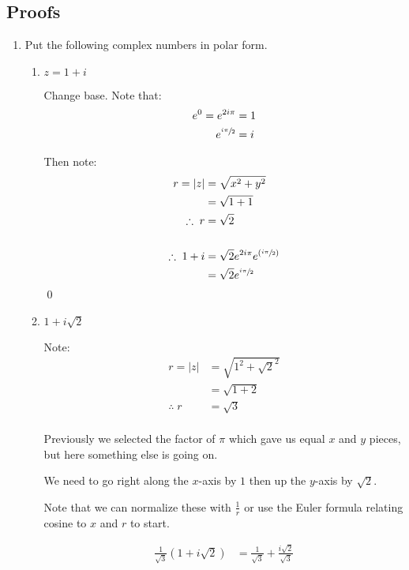 \subsection{Proofs}
\begin{enumerate}


	\item Put the following complex numbers in polar form.
	\begin{enumerate}
		
		
		\item $z = 1 + i$

		Change base. Note that:
		\begin{align*}
			e^0 = e^{2i\pi} &= 1 \\
			e^{\sfrac{i\pi}{2}} &= i\\
		\end{align*} 

		Then note:
		\begin{align*}
			r = |z| &= \sqrt{x^2 + y^2} \\ 
			&= \sqrt{1 + 1} \\ 
			\therefore \; r &= \sqrt{2} \\
			\\
			\therefore \; 1 + i &= \sqrt{2} e^{2i\pi} e^{(\sfrac{i\pi}{2})} \\
			&= \sqrt{2}e^{\sfrac{i\pi}{2}}
		\end{align*}
		\qed
		
		\item $1 + i\sqrt{2}$

		Note:
		\begin{align*}
			r = |z| &= \sqrt{1^2 + \sqrt{2}^2} \\
			&= \sqrt{1 + 2} \\
			\therefore \; r &= \sqrt{3}\\
		\end{align*}

		Previously we selected the factor of $\pi$ which gave us equal $x$ and $y$ pieces, but here something else is going on.
	
		We need to go right along the $x$-axis by $1$ then up the $y$-axis by $\sqrt{2}.$
	
		Note that we can normalize these with $\frac{1}{r}$ or use the Euler formula relating cosine to $x$ and $r$ to start.
		
		\begin{align*}
			\frac{1}{\sqrt{3}}(1 + i\sqrt{2}) &= \frac{1}{\sqrt{3}} + \frac{i\sqrt{2}}{\sqrt{3}} \\
		\end{align*}
	

\end{enumerate}
\end{enumerate}
